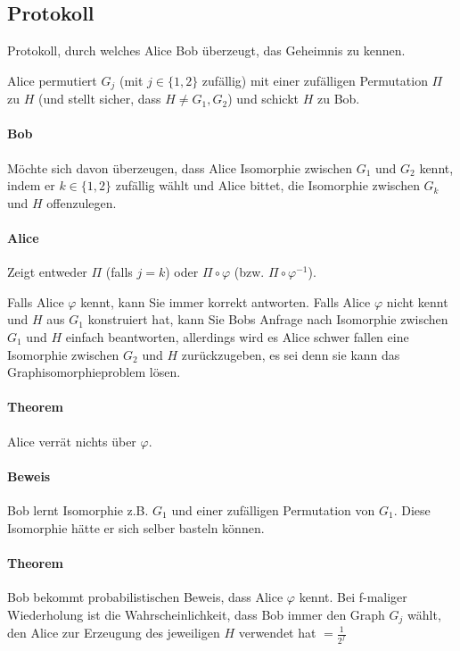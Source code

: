 \subsection{Protokoll}
Protokoll, durch welches Alice Bob überzeugt, das Geheimnis zu kennen.

\par\medskip
Alice permutiert $G_j$ (mit $j \in \{ 1,2 \}$ zufällig) mit einer zufälligen Permutation $\Pi$ zu $H$ (und stellt sicher, dass $H \not= G_1,G_2$) und schickt $H$ zu Bob.\par\medskip

\paragraph*{Bob} Möchte sich davon überzeugen, dass Alice Isomorphie zwischen $G_1$ und $G_2$ kennt, indem er $k \in \{ 1,2 \}$ zufällig wählt und Alice bittet, die Isomorphie zwischen $G_k$ und $H$ offenzulegen.

\paragraph*{Alice} Zeigt entweder $\Pi$ (falls $j=k$) oder $\Pi \circ \varphi$ (bzw. $\Pi \circ \varphi^{-1}$).


\par\medskip
Falls Alice $\varphi$ kennt, kann Sie immer korrekt antworten. Falls Alice $\varphi$ nicht kennt und $H$ aus $G_1$ konstruiert hat, kann Sie Bobs Anfrage nach Isomorphie zwischen $G_1$ und $H$ einfach beantworten, allerdings wird es Alice schwer fallen eine Isomorphie zwischen $G_2$ und $H$ zurückzugeben, es sei denn sie kann das Graphisomorphieproblem lösen.\par\medskip

\paragraph*{Theorem} Alice verrät nichts über $\varphi$.

\paragraph*{Beweis} Bob lernt Isomorphie z.B. $G_1$ und einer zufälligen Permutation von $G_1$. Diese Isomorphie hätte er sich selber basteln können.

\paragraph*{Theorem} Bob bekommt probabilistischen Beweis, dass Alice $\varphi$ kennt. Bei f-maliger Wiederholung ist die Wahrscheinlichkeit, dass Bob immer den Graph $G_j$ wählt, den Alice zur Erzeugung des jeweiligen $H$ verwendet hat $= \frac{1}{2^f}$